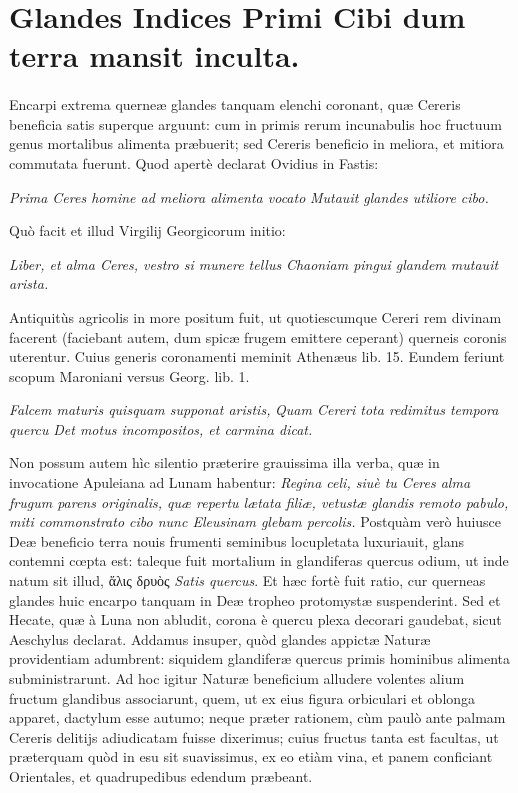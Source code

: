 \documentclass[a4paper, 11pt, oneside, polutonikogreek, latin]{article}
\begin{document}
\section{Glandes Indices Primi Cibi dum terra mansit inculta.}
\paragraph{}
Encarpi extrema querneæ glandes tanquam elenchi coronant, quæ Cereris beneficia satis superque arguunt: cum in primis rerum incunabulis hoc fructuum genus mortalibus alimenta præbuerit; sed Cereris beneficio in meliora, et mitiora commutata fuerunt. Quod apertè declarat Ovidius in Fastis:

\emph{Prima Ceres homine ad meliora alimenta vocato}
\emph{Mutauit glandes utiliore cibo.}

Quò facit et illud Virgilij Georgicorum initio:

\emph{Liber, et alma Ceres, vestro si munere tellus}
\emph{Chaoniam pingui glandem mutauit arista.}

Antiquitùs agricolis in more positum fuit, ut quotiescumque Cereri rem divinam facerent (faciebant autem, dum spicæ frugem emittere ceperant) querneis coronis uterentur. Cuius generis coronamenti meminit Athenæus lib. 15. Eundem feriunt scopum Maroniani versus Georg. lib. 1.

\emph{Falcem maturis quisquam supponat aristis,}
\emph{Quam Cereri tota redimitus tempora quercu}
\emph{Det motus incompositos, et carmina dicat.}

Non possum autem hìc silentio præterire grauissima illa verba, quæ in invocatione Apuleiana ad Lunam habentur: \emph{Regina celi, siuè tu Ceres alma frugum parens originalis, quæ repertu lætata filiæ, vetustæ glandis remoto pabulo, miti commonstrato cibo nunc Eleusinam glebam percolis.} Postquàm verò huiusce Deæ beneficio terra nouis frumenti seminibus locupletata luxuriauit, glans contemni cœpta est: taleque fuit mortalium in glandiferas quercus odium, ut inde natum sit illud, ἅλις δρυὸς \emph{Satis quercus}. Et hæc fortè fuit ratio, cur querneas glandes huic encarpo tanquam in Deæ tropheo protomystæ suspenderint. Sed et Hecate, quæ à Luna non abludit, corona è quercu plexa decorari gaudebat, sicut Aeschylus declarat. Addamus insuper, quòd glandes appictæ Naturæ providentiam adumbrent: siquidem glandiferæ quercus primis hominibus alimenta subministrarunt. Ad hoc igitur Naturæ beneficium alludere volentes alium fructum glandibus associarunt, quem, ut ex eius figura orbiculari et oblonga apparet, dactylum esse autumo; neque præter rationem, cùm paulò ante palmam Cereris delitijs adiudicatam fuisse dixerimus; cuius fructus tanta est facultas, ut præterquam quòd in esu sit suavissimus, ex eo etiàm vina, et panem conficiant Orientales, et quadrupedibus edendum præbeant.
\clearpage
\end{document}
